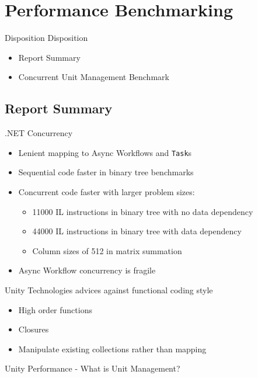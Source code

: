 \section{Performance Benchmarking}
\begin{frame}{\secname}{Disposition}
	Disposition
    \begin{itemize}
        \item Report Summary
        \item Concurrent Unit Management Benchmark
	\end{itemize}
\end{frame}

\subsection{Report Summary}\label{sec:authors}
\begin{frame}{\secname}{\subsecname}
	.NET Concurrency
	\begin{itemize}
		\item Lenient mapping to Async Workflows and \texttt{Task}s %
		\item Sequential code faster in binary tree benchmarks
		\item Concurrent code faster with larger problem sizes:
		\begin{itemize}
			\item 11000 IL instructions in binary tree with no data dependency
			\item 44000 IL instructions in binary tree with data dependency
			\item Column sizes of 512 in matrix summation
		\end{itemize}
		\item Async Workflow concurrency is fragile
	\end{itemize}
\end{frame}

\begin{frame}{\secname}{\subsecname}
	Unity Technologies advices against functional coding style
	\begin{itemize}
		\item High order functions
		\item Closures
		\item Manipulate existing collections rather than mapping
	\end{itemize}
\end{frame}

\begin{frame}{\secname}{\subsecname}
	Unity Performance - What is Unit Management?
\end{frame}

